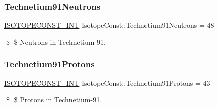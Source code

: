 \subsubsection{\texorpdfstring{Technetium91\+Neutrons}{Technetium91Neutrons}}
{\footnotesize\ttfamily \mbox{\hyperlink{group___isotope_const-_macros_ga5f18360b3e99483a35c32d789e62621c}{I\+S\+O\+T\+O\+P\+E\+C\+O\+N\+S\+T\+\_\+\+I\+NT}} Isotope\+Const\+::\+Technetium91\+Neutrons = 48}

\$ \$ Neutrons in Technetium-\/91. \mbox{\label{group___isotope_const-_technetium-_tc91_ga18b3233f4d3a9e5c7a44e3544e07f927}} 
\subsubsection{\texorpdfstring{Technetium91\+Protons}{Technetium91Protons}}
{\footnotesize\ttfamily \mbox{\hyperlink{group___isotope_const-_macros_ga5f18360b3e99483a35c32d789e62621c}{I\+S\+O\+T\+O\+P\+E\+C\+O\+N\+S\+T\+\_\+\+I\+NT}} Isotope\+Const\+::\+Technetium91\+Protons = 43}

\$ \$ Protons in Technetium-\/91. 